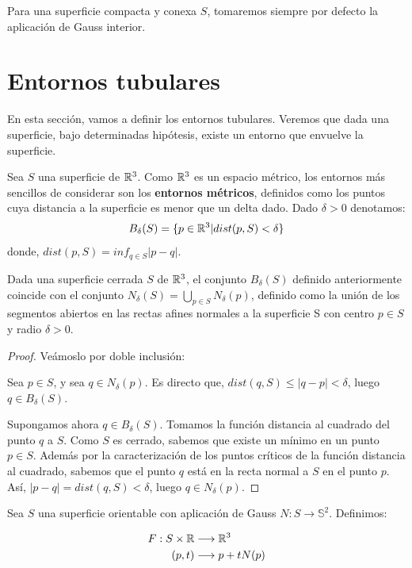 \begin{remark}
Para una superficie compacta y conexa $S$, tomaremos siempre por defecto la aplicación de Gauss interior.
\end{remark}

\section{Entornos tubulares}

En esta sección, vamos a definir los entornos tubulares. Veremos que dada una superficie, bajo determinadas hipótesis, existe un entorno que envuelve la superficie.

Sea $S$ una superficie de $\mathbb{R}^3$. Como $\mathbb{R}^3$ es un espacio métrico, los entornos más sencillos de considerar son los \textbf{entornos métricos}, definidos como los puntos cuya distancia a la superficie es menor que un delta dado. Dado $\delta>0$ denotamos:
%
\begin{equation*}
    B_\delta(S)=\{p\in \mathbb{R}^3 | dist(p,S) < \delta\}
\end{equation*}
%
donde, $dist(p,S) = inf_{q\in S}|p-q|$.

\begin{lemma}
Dada una superficie cerrada $S$ de $\mathbb{R}^3$, el conjunto $B_\delta(S)$ definido anteriormente coincide con el conjunto $N_\delta(S)=\bigcup_{p\in S}N_\delta(p)$, definido como la unión de los segmentos abiertos en las rectas afines normales a la superficie S con centro $p \in S$ y radio $\delta > 0$.
\end{lemma}
\begin{proof}
Veámoslo por doble inclusión:

Sea $p \in S$, y sea $q \in N_\delta(p)$. Es directo que, $dist(q,S) \leq |q-p| < \delta$, luego $q \in B_\delta(S)$.

Supongamos ahora $q \in B_\delta(S)$. Tomamos la función distancia al cuadrado del punto $q$ a $S$. Como $S$ es cerrado, sabemos que existe un mínimo en un punto $p \in S$. Además por la caracterización de los puntos críticos de la función distancia al cuadrado, sabemos que el punto $q$ está en la recta normal a $S$ en el punto $p$. Así, $|p-q| = dist(q,S) < \delta$, luego $q \in N_\delta(p)$.
\end{proof}

Sea $S$ una superficie orientable con aplicación de Gauss $N: S \longrightarrow \mathbb{S}^2$. Definimos:

\begin{align*}
    F: S \times \mathbb{R} &\longrightarrow \mathbb{R}^3 \\
    (p,t) &\longrightarrow p + tN(p)
\end{align*}

